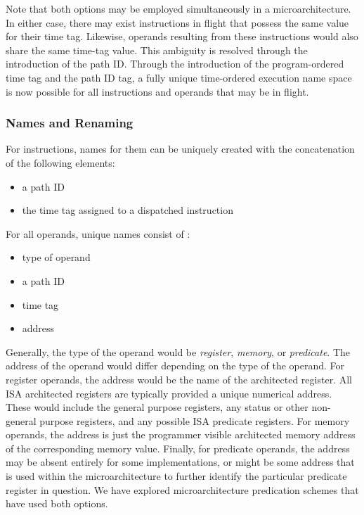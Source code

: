 \documentclass{book}
\begin{document}
Note that both options may be employed simultaneously in a 
microarchitecture.
In either case, there may exist instructions in flight
that possess the same value for their time tag.  
Likewise,
operands resulting from these instructions would also share
the same time-tag value.
This ambiguity is resolved through the
introduction of the path ID.
Through the introduction of the program-ordered time tag and the path ID tag,
a fully unique time-ordered execution name space is now possible for
all instructions and operands that may be in flight.
%
%
\subsubsection{Names and Renaming}
%
For instructions, names for them can be uniquely created
with the concatenation of the following elements:
%
\begin{itemize}
\vspace{-0.10in}
\item{a path ID}
\vspace{-0.10in}
\item{the time tag assigned to a dispatched instruction}
\vspace{-0.10in}
\end{itemize}   
%
For all operands, unique names consist of :
%
\begin{itemize}
\vspace{-0.10in}
\item{type of operand}
\vspace{-0.10in}
\item{a path ID}
\vspace{-0.10in}
\item{time tag}
\vspace{-0.10in}
\item{address}
\vspace{-0.10in}
\end{itemize}   
%

Generally, the type of the operand would be \textit{register},
\textit{memory}, or \textit{predicate}.
The address of the operand would differ
depending on the type of the operand.
For register operands, the address would be
the name of the architected register.
All ISA architected registers are typically provided a
unique numerical address.  These would include the
general purpose registers, any status or other non-general
purpose registers, and any possible ISA predicate registers.
For memory operands, the address is just the
programmer visible architected memory address of the corresponding
memory value.
Finally, for predicate operands, the address
may be absent entirely for some implementations, or
might be some address that is used within the microarchitecture
to further identify the particular predicate register in question.
We have explored microarchitecture predication schemes that 
have used both options.
\end{document}

